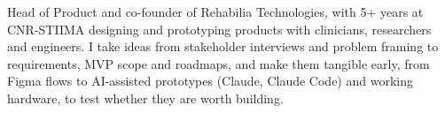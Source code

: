 {Head of Product and co-founder of Rehabilia Technologies, with 5+ years at CNR-STIIMA designing and prototyping products with clinicians, researchers and engineers. I take ideas from stakeholder interviews and problem framing to requirements, MVP scope and roadmaps, and make them tangible early, from Figma flows to AI-assisted prototypes (Claude, Claude Code) and working hardware, to test whether they are worth building.}
